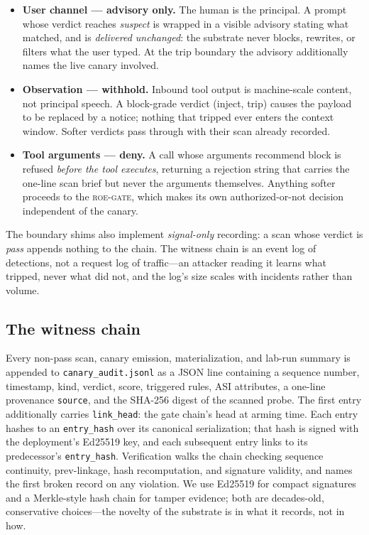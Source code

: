 \documentclass[11pt,a4paper]{article}
\newcommand{\gate}{\textsc{roe-gate}}
\newcommand{\code}[1]{\texttt{#1}}
\begin{document}
\begin{itemize}[leftmargin=1.6em, itemsep=0.15em]
  \item \textbf{User channel --- advisory only.} The human is the principal.
  A prompt whose verdict reaches \emph{suspect} is wrapped in a visible
  advisory stating what matched, and is \emph{delivered unchanged}: the
  substrate never blocks, rewrites, or filters what the user typed. At the
  trip boundary the advisory additionally names the live canary involved.
  \item \textbf{Observation --- withhold.} Inbound tool output is
  machine-scale content, not principal speech. A block-grade verdict
  (inject, trip) causes the payload to be replaced by a notice; nothing
  that tripped ever enters the context window. Softer verdicts pass
  through with their scan already recorded.
  \item \textbf{Tool arguments --- deny.} A call whose arguments recommend
  block is refused \emph{before the tool executes}, returning a rejection
  string that carries the one-line scan brief but never the arguments
  themselves. Anything softer proceeds to the \gate{}, which makes its own
  authorized-or-not decision independent of the canary.
\end{itemize}

The boundary shims also implement \emph{signal-only} recording: a scan whose
verdict is \emph{pass} appends nothing to the chain. The witness chain is an
event log of detections, not a request log of traffic---an attacker reading
it learns what tripped, never what did not, and the log's size scales with
incidents rather than volume.

\subsection{The witness chain}

Every non-pass scan, canary emission, materialization, and lab-run summary is
appended to \code{canary\_audit.jsonl} as a JSON line containing a sequence
number, timestamp, kind, verdict, score, triggered rules, ASI attributes,
a one-line provenance \code{source}, and the SHA-256 digest of the scanned
probe. The first entry additionally carries \code{link\_head}: the gate
chain's head at arming time. Each entry hashes to an \code{entry\_hash} over
its canonical serialization; that hash is signed with the deployment's
Ed25519 key, and each subsequent entry links to its predecessor's
\code{entry\_hash}. Verification walks the chain checking sequence
continuity, prev-linkage, hash recomputation, and signature validity, and
names the first broken record on any violation. We use Ed25519
\cite{ed25519} for compact signatures and a Merkle-style hash chain
\cite{merkle} for tamper evidence; both are decades-old, conservative
choices---the novelty of the substrate is in what it records, not in how.
\end{document}

